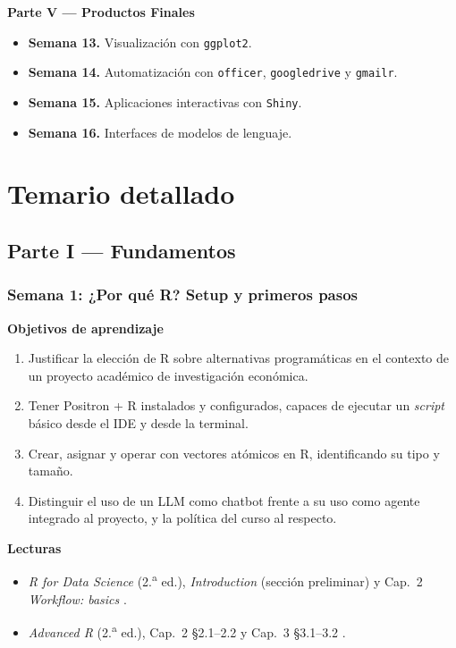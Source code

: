 \documentclass[11pt,letterpaper]{article}
\newcommand{\semana}[2]{%
  \subsubsection*{\color{main}Semana #1: #2}%
}
\begin{document}
\smallskip
\noindent\textbf{\textcolor{main}{Parte V --- Productos Finales}}
\begin{itemize}[leftmargin=*, itemsep=1pt]
    \item \textbf{Semana 13.} Visualización con \texttt{ggplot2}.
    \item \textbf{Semana 14.} Automatización con \texttt{officer}, \texttt{googledrive} y \texttt{gmailr}.
    \item \textbf{Semana 15.} Aplicaciones interactivas con \texttt{Shiny}.
    \item \textbf{Semana 16.} Interfaces de modelos de lenguaje.
\end{itemize}

\section{Temario detallado}

\subsection*{\color{main}Parte I --- Fundamentos}

\semana{1}{¿Por qué R? Setup y primeros pasos}

\medskip
\noindent\textbf{Objetivos de aprendizaje}
\begin{enumerate}[leftmargin=*, itemsep=1pt]
    \item Justificar la elección de R sobre alternativas programáticas en el contexto de un proyecto académico de investigación económica.
    \item Tener Positron + R instalados y configurados, capaces de ejecutar un \textit{script} básico desde el IDE y desde la terminal.
    \item Crear, asignar y operar con vectores atómicos en R, identificando su tipo y tamaño.
    \item Distinguir el uso de un LLM como chatbot frente a su uso como agente integrado al proyecto, y la política del curso al respecto.
\end{enumerate}

\medskip
\noindent\textbf{Lecturas}
\begin{itemize}[leftmargin=*, itemsep=1pt]
    \item \textit{R for Data Science} (2.\textsuperscript{a} ed.), \textit{Introduction} (sección preliminar) y Cap.\ 2 \textit{Workflow: basics} \cite{wickham2023r4ds}.
    \item \textit{Advanced R} (2.\textsuperscript{a} ed.), Cap.\ 2 §2.1--2.2 y Cap.\ 3 §3.1--3.2 \cite{wickham2019advr}.
\end{itemize}
\end{document}

